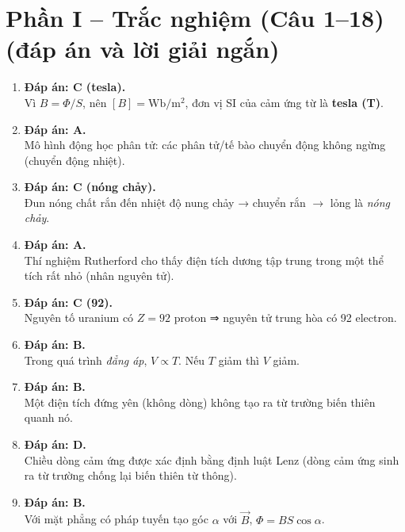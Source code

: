 \documentclass[12pt,a4paper]{article}
\begin{document}
\section*{Phần I -- Trắc nghiệm (Câu 1--18) \\ \small (đáp án và lời giải ngắn)}
\begin{enumerate}[left=0pt]
\item \textbf{Đáp án: C (tesla).} \\
  Vì $B=\Phi/S$, nên $[B]=\mathrm{Wb/m^2}$, đơn vị SI của cảm ứng từ là \textbf{tesla (T)}.

\item \textbf{Đáp án: A.} \\
  Mô hình động học phân tử: các phân tử/tế bào chuyển động không ngừng (chuyển động nhiệt).

\item \textbf{Đáp án: C (nóng chảy).} \\
  Đun nóng chất rắn đến nhiệt độ nung chảy → chuyển rắn $\to$ lỏng là \emph{nóng chảy}.

\item \textbf{Đáp án: A.} \\
  Thí nghiệm Rutherford cho thấy điện tích dương tập trung trong một thể tích rất nhỏ (nhân nguyên tử).

\item \textbf{Đáp án: C (92).} \\
  Nguyên tố uranium có $Z=92$ proton ⇒ nguyên tử trung hòa có 92 electron.

\item \textbf{Đáp án: B.} \\
  Trong quá trình \emph{đẳng áp}, $V\propto T$. Nếu $T$ giảm thì $V$ giảm.

\item \textbf{Đáp án: B.} \\
  Một điện tích đứng yên (không dòng) không tạo ra từ trường biến thiên quanh nó.

\item \textbf{Đáp án: D.} \\
  Chiều dòng cảm ứng được xác định bằng định luật Lenz (dòng cảm ứng sinh ra từ trường chống lại biến thiên từ thông).

\item \textbf{Đáp án: B.} \\
  Với mặt phẳng có pháp tuyến tạo góc $\alpha$ với $\vec B$, $\Phi=BS\cos\alpha$.


\end{enumerate}
\end{document}
